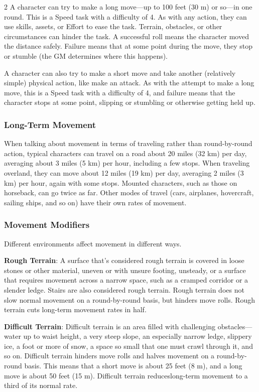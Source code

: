 \begin{multicols}{2}
A character can try to make a long move—up to 100 feet (30 m) or so—in one round. This is a Speed task with a difficulty of 4. As with any action, they can use skills, assets, or Effort to ease the task. Terrain, obstacles, or other circumstances can hinder the task. A successful roll means the character moved the distance safely. Failure means that at some point during the move, they stop or stumble (the GM determines where this happens).

A character can also try to make a short move and take another (relatively simple) physical action, like make an attack. As with the attempt to make a long move, this is a Speed task with a difficulty of 4, and failure means that the character stops at some point, slipping or stumbling or otherwise getting held up.

\subsubsection{Long-Term Movement}

When talking about movement in terms of traveling rather than round-by-round action, typical characters can travel on a road about 20 miles (32 km) per day, averaging about 3 miles (5 km) per hour, including a few stops. When traveling overland, they can move about 12 miles (19 km) per day, averaging 2 miles (3 km) per hour, again with some stops. Mounted characters, such as those on horseback, can go twice as far. Other modes of travel (cars, airplanes, hovercraft, sailing ships, and so on) have their own rates of movement.

\subsubsection{Movement Modifiers}

Different environments affect movement in different ways.

\textbf{Rough Terrain}: A surface that’s considered rough terrain is covered in loose stones or other material, uneven or with unsure footing, unsteady, or a surface that requires movement across a narrow space, such as a cramped corridor or a slender ledge. Stairs are also considered rough terrain. Rough terrain does not slow normal movement on a round-by-round basis, but hinders move rolls. Rough terrain cuts long-term movement rates in half.

\textbf{Difficult Terrain}: Difficult terrain is an area filled with challenging obstacles—water up to waist height, a very steep slope, an especially narrow ledge, slippery ice, a foot or more of snow, a space so small that one must crawl through it, and so on. Difficult terrain hinders move rolls and halves movement on a
round-by-round basis. This means that a short move is about 25 feet (8 m), and a long move is about 50 feet (15 m). Difficult terrain reduceslong-term movement to a third of its normal rate.


\end{multicols}

